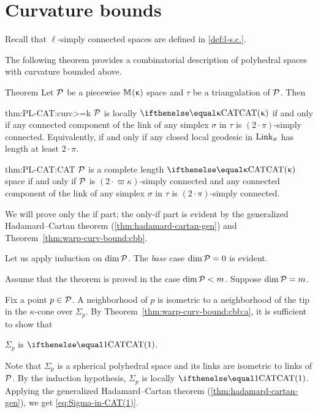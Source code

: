 \section{Curvature bounds}


Recall that $\ell$-simply connected spaces are defined in \ref{def:l-s.c.}.

The following theorem provides a combinatorial description of polyhedral spaces with curvature bounded above.


\begin{thm}{Theorem}\label{thm:PL-CAT}
Let $\mathcal{P}$ be a piecewise
$\mathbb{M}_{{}}^{}({\upkappa})$ space and $\tau$ be a triangulation of $\mathcal{P}$. Then 

\begin{subthm}{thm:PL-CAT:curc>=k}
$\mathcal{P}$  is locally $\CAT\kappa$
if and only if any connected component of the link of any simplex $\sigma$ in $\tau$
is $(2\cdot\pi)$-simply connected.
Equivalently, if and only if any closed local geodesic in $\mathop{\rm Link}\nolimits_\upsigma$ has length at least $2\cdot\pi$.
\end{subthm}

\begin{subthm}{thm:PL-CAT:CAT}
$\mathcal{P}$ is a complete length $\CAT\kappa$ space
if and only if $\mathcal{P}$ is $(2\cdot\varpi\kappa)$-simply connected and any connected component of the link of any simplex $\sigma$ in $\tau$
is $(2\cdot\pi)$-simply connected.
\end{subthm}

\end{thm}


We will prove only the if part;
the only-if part is evident by the generalized Hadamard--Cartan theorem (\ref{thm:hadamard-cartan-gen}) and Theorem~\ref{thm:warp-curv-bound:cbb}.

Let us apply induction on $\mathop{\rm dim}\nolimits\mathcal{P}$.
The  {}\emph{base}  case $\mathop{\rm dim}\nolimits\mathcal{P}=0$ is evident.

Assume that the theorem is proved in the case $\dim\spc{P}\z<m$. Suppose  $\mathop{\rm dim}\nolimits\mathcal{P}=m$.

Fix a point $p\in\spc{P}$.
A neighborhood of $p$ 
is isometric to a neighborhood of the tip in the $\kappa$-cone over 
 $\Sigma_p$.
By Theorem~\ref{thm:warp-curv-bound:cbb:a}, 
it is sufficient to show that 
\begin{clm}{}\label{eq:Sigma-in-CAT(1)}
 $\Sigma_p$ is $\CAT1$.
\end{clm}

Note that $\Sigma_p$ is a spherical polyhedral space 
and its  links are isometric to  links of $\mathcal{P}$. 
By the  induction hypothesis, $\Sigma_p$ is locally $\CAT1$.
Applying the generalized Hadamard--Cartan theorem (\ref{thm:hadamard-cartan-gen}),
we get \ref{eq:Sigma-in-CAT(1)}.

